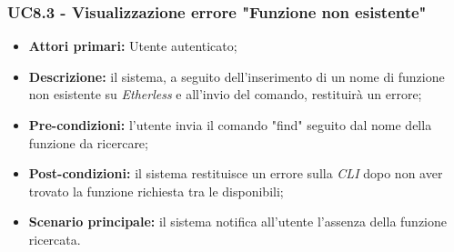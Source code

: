\subsubsection{UC8.3 - Visualizzazione errore "Funzione non esistente"}
\begin{itemize}
	\item \textbf{Attori primari:} Utente autenticato;
	\item \textbf{Descrizione:} il sistema, a seguito dell'inserimento di un nome di funzione non esistente su \textit{Etherless} e all'invio del comando, restituirà un errore;
	\item \textbf{Pre-condizioni:} l'utente invia il comando "find" seguito dal nome della funzione da ricercare;
	\item \textbf{Post-condizioni:} il sistema restituisce un errore sulla \textit{CLI\glo} dopo non aver trovato la funzione richiesta tra le disponibili;
	\item \textbf{Scenario principale:} il sistema notifica all'utente l'assenza della funzione ricercata.
\end{itemize}
